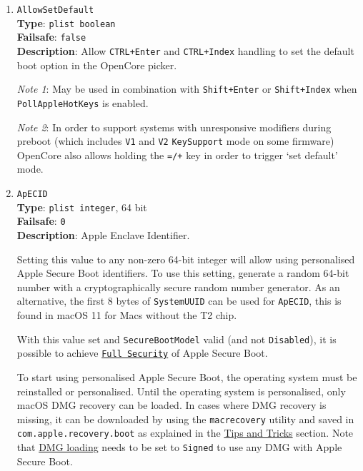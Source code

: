 \documentclass[]{article}
\begin{document}
\begin{enumerate}

\item
  \texttt{AllowSetDefault}\\
  \textbf{Type}: \texttt{plist\ boolean}\\
  \textbf{Failsafe}: \texttt{false}\\
  \textbf{Description}: Allow \texttt{CTRL+Enter} and \texttt{CTRL+Index} handling
  to set the default boot option in the OpenCore picker.

  \emph{Note 1}: May be used in combination
  with \texttt{Shift+Enter} or \texttt{Shift+Index} when \texttt{PollAppleHotKeys} is
  enabled.

  \emph{Note 2}: In order to support systems with unresponsive modifiers during preboot
  (which includes \texttt{V1} and \texttt{V2} \texttt{KeySupport} mode on some firmware)
  OpenCore also allows holding the \texttt{=/+} key in order to trigger `set default' mode.

\item
  \texttt{ApECID}\\
  \textbf{Type}: \texttt{plist\ integer}, 64 bit\\
  \textbf{Failsafe}: \texttt{0}\\
  \textbf{Description}: Apple Enclave Identifier.

  Setting this value to any non-zero 64-bit integer will allow using
  personalised Apple Secure Boot identifiers. To use this setting,
  generate a random 64-bit number with a cryptographically secure
  random number generator. As an alternative, the first 8 bytes of \texttt{SystemUUID}
  can be used for \texttt{ApECID}, this is found in macOS 11 for Macs without
  the T2 chip.

  With this value set and \texttt{SecureBootModel} valid
  (and not \texttt{Disabled}), it is possible to achieve
  \href{https://support.apple.com/en-us/HT208330}{\texttt{Full Security}} of Apple
  Secure Boot.

  To start using personalised Apple Secure Boot, the operating system must be
  reinstalled or personalised. Until the operating system is personalised,
  only macOS DMG recovery can be loaded. In cases where DMG recovery is missing,
  it can be downloaded by using the \texttt{macrecovery} utility and saved in
  \texttt{com.apple.recovery.boot} as explained in the
  \hyperref[reinstallmacos]{Tips and Tricks} section. Note that
  \hyperref[securedmgloading]{DMG loading} needs to be set to \texttt{Signed}
  to use any DMG with Apple Secure Boot.


\end{enumerate}
\end{document}
